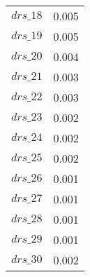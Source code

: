 \begin{center}
\begin{longtable}{cc}
$drs\_18$ 	 & 	 0.005 \\
$drs\_19$ 	 & 	 0.005 \\
$drs\_20$ 	 & 	 0.004 \\
$drs\_21$ 	 & 	 0.003 \\
$drs\_22$ 	 & 	 0.003 \\
$drs\_23$ 	 & 	 0.002 \\
$drs\_24$ 	 & 	 0.002 \\
$drs\_25$ 	 & 	 0.002 \\
$drs\_26$ 	 & 	 0.001 \\
$drs\_27$ 	 & 	 0.001 \\
$drs\_28$ 	 & 	 0.001 \\
$drs\_29$ 	 & 	 0.001 \\
$drs\_30$ 	 & 	 0.002 \\
\bottomrule%
\end{longtable}
\end{center}
